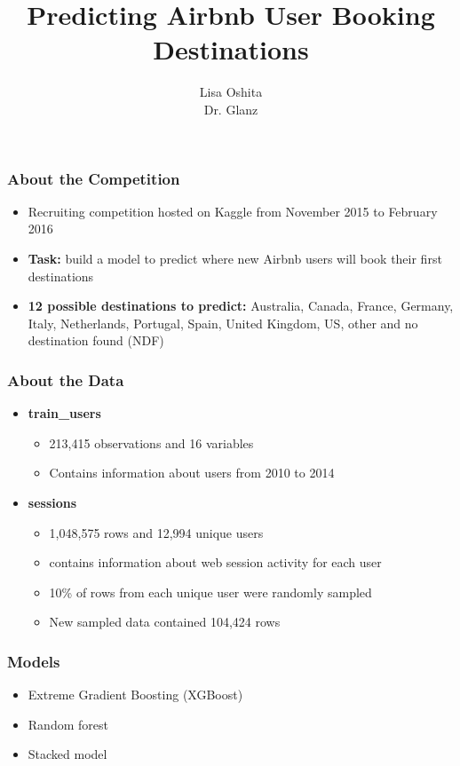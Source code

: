 \documentclass{beamer}
\title{Predicting Airbnb User Booking Destinations}
\author{Lisa Oshita\\Dr. Glanz}
\begin{document}
 
\frame{\titlepage}


\begin{frame}
\frametitle{About the Competition}
  \begin{itemize}
    \item Recruiting competition hosted on Kaggle from November 2015 to February 2016 \vspace{1ex}
    \item \textbf{Task:} build a model to predict where new Airbnb users will book their first destinations \vspace{1ex}
    \item \textbf{12 possible destinations to predict:} Australia, Canada, France, Germany, Italy, Netherlands, Portugal, Spain, United Kingdom, US, other and no destination found (NDF)
  \end{itemize}
\end{frame}


\begin{frame}
\frametitle{About the Data}
\begin{itemize}
  \item \textbf{train\_users} 
  \begin{itemize}
    \item 213,415 observations and 16 variables
    \item Contains information about users from 2010 to 2014 \vspace{2ex}
  \end{itemize}
  \item \textbf{sessions}
  \begin{itemize}
    \item 1,048,575 rows and 12,994 unique users
    \item contains information about web session activity for each user
    \item 10\% of rows from each unique user were randomly sampled
    \item New sampled data contained 104,424 rows  
  \end{itemize}
\end{itemize}
\end{frame}


\begin{frame}
\frametitle{Models}
  \begin{itemize}
    \item Extreme Gradient Boosting (XGBoost)
    \item Random forest
    \item Stacked model
  \end{itemize}
\end{frame}
\end{document}
